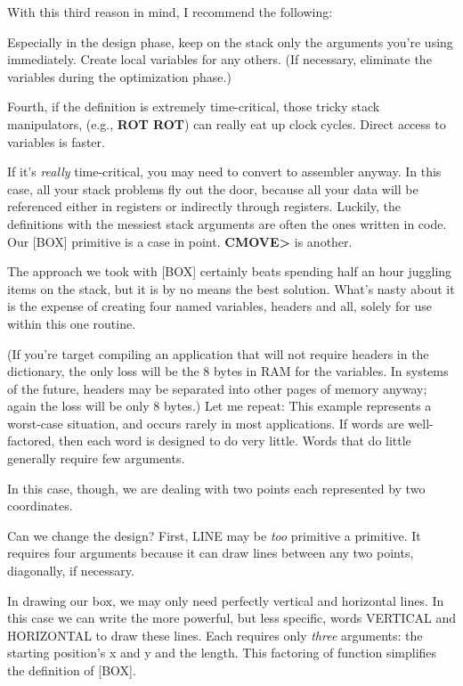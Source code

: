 With this third reason in mind, I recommend the following:

\begin{tip}
Especially in the design phase, keep on the stack only the arguments you're
using immediately. Create local variables for any others. (If necessary,
eliminate the variables during the optimization phase.)
\end{tip}
Fourth, if the definition is extremely time-critical, those tricky stack
manipulators, (e.g., \textbf{ROT ROT}) can really eat up clock cycles. Direct
access to variables is faster.

If it's \emph{really} time-critical, you may need to convert to assembler
anyway. In this case, all your stack problems fly out the door, because all
your data will be referenced either in registers or indirectly through
registers. Luckily, the definitions with the messiest stack arguments are
often the ones written in code. Our [BOX] primitive is a case in point.
\textbf{CMOVE>} is another.

The approach we took with [BOX] certainly beats spending half an
hour juggling items on the stack, but it is by no means the best solution.
What's nasty about it is the expense of creating four named variables,
headers and all, solely for use within this one routine.

(If you're target compiling an application that will not require
headers in the dictionary, the only loss will be the 8 bytes in RAM for the
variables. In \Forth{} systems of the future, headers may be separated
into other pages of memory anyway; again the loss will be only 8 bytes.)
Let me repeat: This example represents a worst-case situation, and
occurs rarely in most \Forth{} applications. If words are well-factored,
then each word is designed to do very little. Words that do little generally
require few arguments.

In this case, though, we are dealing with two points each represented
by two coordinates.

Can we change the design? First, LINE may be \emph{too} primitive a
primitive. It requires four arguments because it can draw lines between
any two points, diagonally, if necessary.

In drawing our box, we may only need perfectly vertical and horizontal
lines. In this case we can write the more powerful, but less specific,
words VERTICAL and HORIZONTAL to draw these lines. Each requires
only \emph{three} arguments: the starting position's x and y and the
length. This factoring of function simplifies the definition of [BOX].

